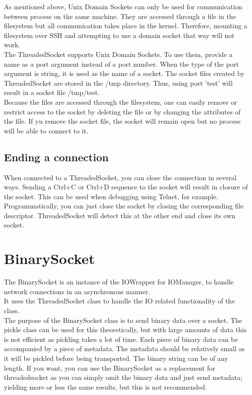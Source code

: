 \documentclass[a4paper, 10pt, oneside]{article}
\begin{document}
As mentioned above, Unix Domain Sockets can only be used for communication
between process on the same machine. They are accessed through a file in the
filesystem but all communication takes place in the kernel. Therefore, mounting
a filesystem over SSH and attempting to use a domain socket that way will not
work.\\

The ThreadedSocket supports Unix Domain Sockets. To use them, provide a name as
a port argument instead of a port number. When the type of the port argument is
string, it is used as the name of a socket. The socket files created by
ThreadedSocket are stored in the /tmp directory. Thus, using port 'test' will
result in a socket file /tmp/test.\\

Because the files are accessed through the filesystem, one can easily remove or
restrict access to the socket by deleting the file or by changing the attributes
of the file. If yu remove the socket file, the socket will remain open but no
process will be able to connect to it.

\subsection{Ending a connection}
When connected to a ThreadedSocket, you can close the connection in several
ways. Sending a Ctrl+C or Ctrl+D sequence to the socket will result in closure
of the socket. This can be used when debugging using Telnet, for example.\\

Programmatically, you can just close the socket by closing the corresponding
file descriptor. ThreadedSocket will detect this at the other end and close its
own socket.

\section{BinarySocket}
The BinarySocket is an instance of the IOWrapper for IOManager, to handle
network connections in an asynchronous manner.\\

It uses the ThreadedSocket class to handle the IO related functionality of the
class.\\

The purpose of the BinarySocket class is to send binary data over a socket.
The pickle class can be used for this theoretically, but with large amounts of
data this is not efficient as pickling takes a lot of time. Each piece of binary
data can be accompanied by a piece of metadata. The metadata should be
relatively small as it will be pickled before being transported. The binary
string can be of any length. If you want, you can use the BinarySocket as a
replacement for threadedsocket as you can simply omit the binary data and just
send metadata; yielding more or less the same results, but this is not
recommended.\\
\end{document}
